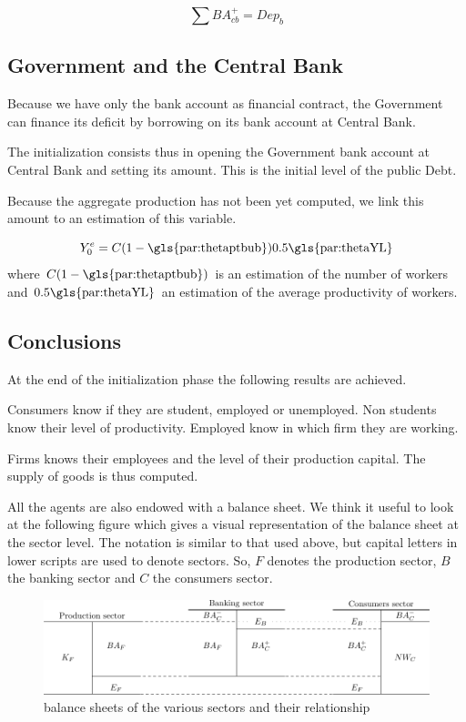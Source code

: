 \documentclass{book}
\begin{document}
\[
	\sum BA^{+}_{cb}=Dep_b
\]
\subsection{Government and the Central Bank}
Because we have only the bank account as financial contract, the Government can finance its deficit by borrowing on its bank account at Central Bank. 

The initialization consists thus in opening the Government bank account at Central Bank and setting its amount. This is the initial level of the public Debt.

Because the aggregate production has not been yet computed, we link this amount to an estimation of this variable.

\[
	Y^e_0=C(1-\textnormal{\gls{par:thetaptbub}})0.5\textnormal{\gls{par:thetaYL}}
\]
where $C(1-\textnormal{\gls{par:thetaptbub}})$ is an estimation of the number of workers and $0.5\textnormal{\gls{par:thetaYL}}$ an estimation of the average productivity of workers.


\subsection{Conclusions}

At the end of the initialization phase the following results are achieved.

Consumers know if they are student, employed or unemployed. Non students know their level of productivity. Employed know in which firm they are working.

Firms knows their employees and the level of their production capital. The supply of goods is thus computed.

All the agents are also endowed with a balance sheet. We think it useful to look at the following figure which gives a visual representation of the balance sheet at the sector level. 
The notation is similar to that used above, but capital letters in lower scripts are used to denote sectors. So, $F$ denotes the production sector, $B$ the banking sector and $C$ the consumers sector. 

\begin{figure}[htp]
	\centering
\includegraphics[scale=0.7]{manual_balances-0.pdf}
	\caption{balance sheets of the various sectors and their relationship}
	\label{fig:balances}
\end{figure}
\end{document}
